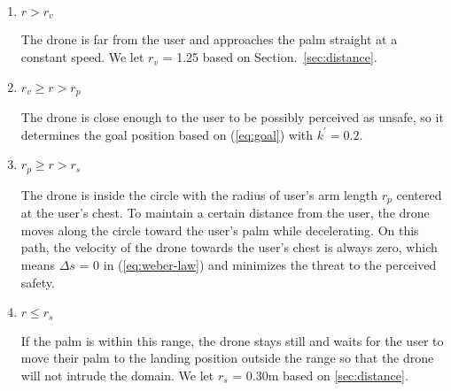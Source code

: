 \begin{enumerate}
    \item $r > r_v$
    
    The drone is far from the user and approaches the palm straight at a constant speed.
    We let $r_v$ = 1.25 based on Section.~\ref{sec:distance}.

    \item $r_v \geq r > r_p$
    
    The drone is close enough to the user to be possibly perceived as unsafe, 
    so it determines the goal position based on (\ref{eq:goal}) with $k^\prime = 0.2$.

    \item $r_p \geq r > r_s$
    
    The drone is inside the circle with the radius of user's arm length $r_p$ centered at the user's chest.
    To maintain a certain distance from the user, the drone moves along the circle toward the user's palm while decelerating.
    On this path, the velocity of the drone towards the user's chest is always zero,
    which means $\Delta s$ = 0 in (\ref{eq:weber-law}) and minimizes the threat to the perceived safety.

    \item $r \leq r_s$
    \label{sec:innermost}
    
    If the palm is within this range, the drone stays still and waits for the user to move their palm to the landing position outside the range so that the drone will not intrude the domain.
    We let $r_s$ = 0.30m based on \ref{sec:distance}.

\end{enumerate}
